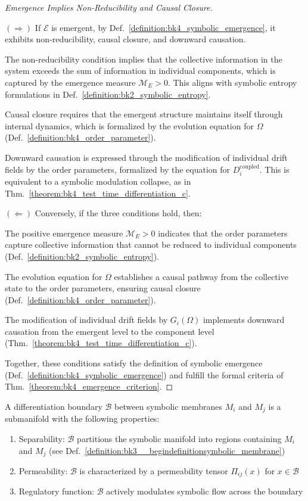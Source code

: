 \begin{proof}[Emergence Implies Non-Reducibility and Causal Closure]
\label{proof:bk4_emergence_conditions}

$(\Rightarrow)$ If $\mathcal{E}$ is emergent, by Def.~\ref{definition:bk4_symbolic_emergence}, it exhibits non-reducibility, causal closure, and downward causation.

The non-reducibility condition implies that the collective information in the system exceeds the sum of information in individual components, which is captured by the emergence measure $\mathcal{M}_E > 0$.
This aligns with symbolic entropy formulations in Def.~\ref{definition:bk2_symbolic_entropy}.

Causal closure requires that the emergent structure maintains itself through internal dynamics, which is formalized by the evolution equation for $\Omega$ (Def.~\ref{definition:bk4_order_parameter}).

Downward causation is expressed through the modification of individual drift fields by the order parameters, formalized by the equation for $D_i^{\text{coupled}}$.
This is equivalent to a symbolic modulation collapse, as in Thm.~\ref{theorem:bk4_test_time_differentiation_c}.

$(\Leftarrow)$ Conversely, if the three conditions hold, then:

The positive emergence measure $\mathcal{M}_E > 0$ indicates that the order parameters capture collective information that cannot be reduced to individual components (Def.~\ref{definition:bk2_symbolic_entropy}).

The evolution equation for $\Omega$ establishes a causal pathway from the collective state to the order parameters, ensuring causal closure (Def.~\ref{definition:bk4_order_parameter}).

The modification of individual drift fields by $G_i(\Omega)$ implements downward causation from the emergent level to the component level (Thm.~\ref{theorem:bk4_test_time_differentiation_c}).

Together, these conditions satisfy the definition of symbolic emergence (Def.~\ref{definition:bk4_symbolic_emergence}) and fulfill the formal criteria of Thm.~\ref{theorem:bk4_emergence_criterion}.

\end{proof}
\begin{definition} \label{definition:bk4_differentiation_boundary}
A differentiation boundary $\mathcal{B}$ between symbolic membranes $M_i$ and $M_j$ is a submanifold with the following properties:
\begin{enumerate}
    \item Separability: $\mathcal{B}$ partitions the symbolic manifold into regions containing $M_i$ and $M_j$ (see Def.~\ref{definition:bk3__begindefinitionsymbolic_membrane})
    \item Permeability: $\mathcal{B}$ is characterized by a permeability tensor $\Pi_{ij}(x)$ for $x \in \mathcal{B}$
    \item Regulatory function: $\mathcal{B}$ actively modulates symbolic flow across the boundary
\end{enumerate}
\end{definition}
